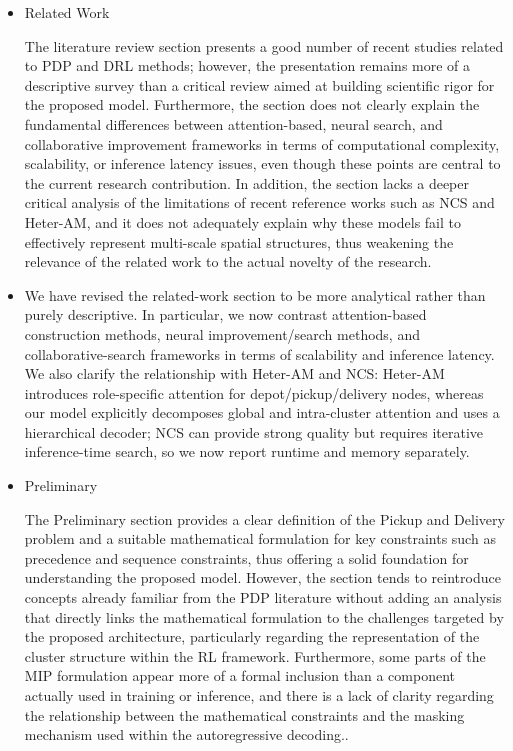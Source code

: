 \documentclass{article}
\begin{document}
\begin{itemize}
\item[\textbf{Comment. 3}] {Related Work


The literature review section presents a good number of recent studies related to PDP and DRL methods; however, the presentation remains more of a descriptive survey than a critical review aimed at building scientific rigor for the proposed model. Furthermore, the section does not clearly explain the fundamental differences between attention-based, neural search, and collaborative improvement frameworks in terms of computational complexity, scalability, or inference latency issues, even though these points are central to the current research contribution. In addition, the section lacks a deeper critical analysis of the limitations of recent reference works such as NCS and Heter-AM, and it does not adequately explain why these models fail to effectively represent multi-scale spatial structures, thus weakening the relevance of the related work to the actual novelty of the research.}


\item[\textbf{Response:}] We have revised the related-work section to be more analytical rather than purely descriptive. In particular, we now contrast attention-based construction methods, neural improvement/search methods, and collaborative-search frameworks in terms of scalability and inference latency. We also clarify the relationship with Heter-AM and NCS: Heter-AM introduces role-specific attention for depot/pickup/delivery nodes, whereas our model explicitly decomposes global and intra-cluster attention and uses a hierarchical decoder; NCS can provide strong quality but requires iterative inference-time search, so we now report runtime and memory separately.


\item[\textbf{Comment. 4}] {Preliminary


The Preliminary section provides a clear definition of the Pickup and Delivery problem and a suitable mathematical formulation for key constraints such as precedence and sequence constraints, thus offering a solid foundation for understanding the proposed model. However, the section tends to reintroduce concepts already familiar from the PDP literature without adding an analysis that directly links the mathematical formulation to the challenges targeted by the proposed architecture, particularly regarding the representation of the cluster structure within the RL framework. Furthermore, some parts of the MIP formulation appear more of a formal inclusion than a component actually used in training or inference, and there is a lack of clarity regarding the relationship between the mathematical constraints and the masking mechanism used within the autoregressive decoding..}



\end{itemize}
\end{document}
